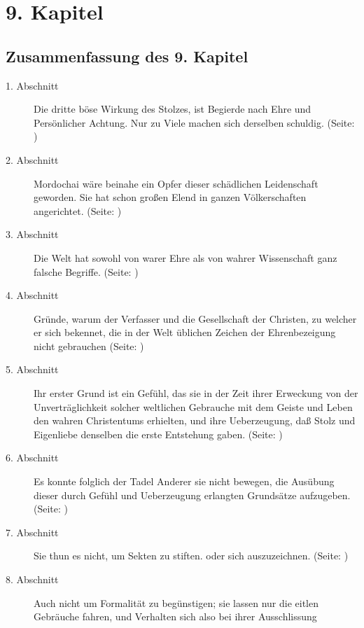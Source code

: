 

\chapter{9. Kapitel} \label{kap9}


\section{Zusammenfassung des 9. Kapitel}
\footnotesize
\begin{description}
\item[1. Abschnitt] Die dritte böse Wirkung des Stolzes, ist Begierde nach Ehre
und Persönlicher Achtung. Nur zu Viele machen sich derselben schuldig. (Seite: \pageref{kap9_ab1})
\item[2. Abschnitt] Mordochai wäre beinahe ein Opfer dieser schädlichen
Leidenschaft geworden. Sie hat schon großen Elend in ganzen Völkerschaften
angerichtet. (Seite: \pageref{kap9_ab2})
\item[3. Abschnitt] Die Welt hat sowohl von warer Ehre als von wahrer
Wissenschaft ganz falsche Begriffe. (Seite: \pageref{kap9_ab3})
\item[4. Abschnitt] Gründe, warum der Verfasser und die Gesellschaft der
Christen, zu welcher er sich bekennet, die in der Welt üblichen Zeichen der
Ehrenbezeigung nicht gebrauchen (Seite: \pageref{kap9_ab4})
\item[5. Abschnitt] Ihr erster Grund ist ein Gefühl, das sie in der Zeit ihrer
Erweckung von der Unverträglichkeit solcher weltlichen Gebrauche mit dem Geiste
und Leben den wahren Christentums erhielten, und ihre Ueberzeugung, daß Stolz
und Eigenliebe denselben die erste Entstehung gaben. (Seite: \pageref{kap9_ab5})
\item[6. Abschnitt] Es konnte folglich der Tadel Anderer sie nicht bewegen, die
Ausübung dieser durch Gefühl und Ueberzeugung erlangten Grundsätze aufzugeben. (Seite: \pageref{kap9_ab6})
\item[7. Abschnitt] Sie thun es nicht, um Sekten zu stiften. oder sich
auszuzeichnen. (Seite: \pageref{kap9_ab7})
\item[8. Abschnitt] Auch nicht um Formalität zu begünstigen; sie lassen nur die
eitlen Gebräuche fahren, und Verhalten sich also bei ihrer Ausschlissung

\end{description}
